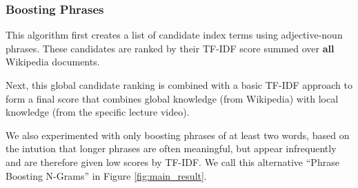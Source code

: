 \subsubsection{Boosting Phrases}

This algorithm first creates a list of candidate index terms using
adjective-noun phrases. These candidates are ranked by their TF-IDF score
summed over {\bf all} Wikipedia documents.

Next, this global candidate ranking is combined with a basic TF-IDF
approach to form a final score that combines global knowledge (from
Wikipedia) with local knowledge (from the specific lecture video).
%

We also experimented with only boosting phrases of at least two words,
based on the intution that longer phrases are often meaningful, but
appear infrequently and are therefore given low scores by TF-IDF. We
call this alternative ``Phrase Boosting N-Grams'' in Figure
\ref{fig:main_result}.

